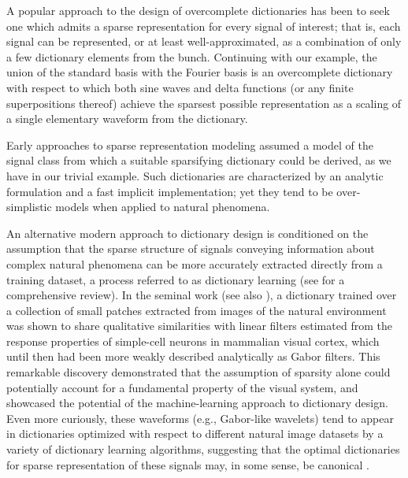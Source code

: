 A popular approach to the design of overcomplete dictionaries has been to seek one which admits a sparse representation for every signal of interest; that is, each signal can be represented, or at least well-approximated, as a combination of only a few dictionary elements from the bunch. Continuing with our example, the union of the standard basis with the Fourier basis is an overcomplete dictionary with respect to which both sine waves and delta functions (or any finite superpositions thereof) achieve the sparsest possible representation as a scaling of a single elementary waveform from the dictionary.

Early approaches to sparse representation modeling assumed a model of the signal class from which a suitable sparsifying dictionary could be derived, as we have in our trivial example. Such dictionaries are characterized by an analytic formulation and a fast implicit implementation; yet they tend to be over-simplistic models when applied to natural phenomena. 

An alternative modern approach to dictionary design is conditioned on the assumption that the sparse structure of signals conveying information about complex natural phenomena can be more accurately extracted directly from a training dataset, a process referred to as dictionary learning  (see \cite{Zhang15} for a comprehensive review). In the seminal work \cite{Olshausen96} (see also \cite{hurri1996image, bell1997independent, van1998independent}), a dictionary trained over a collection of small patches extracted from images of the natural environment was shown to share qualitative similarities with linear filters estimated from the response properties of simple-cell neurons in mammalian visual cortex, which until then had been more weakly described analytically as Gabor filters. This remarkable discovery demonstrated that the assumption of sparsity alone could potentially account for a fundamental property of the visual system, and showcased the potential of the machine-learning approach to dictionary design. Even more curiously, these waveforms (e.g., Gabor-like wavelets) tend to appear in dictionaries optimized with respect to different natural image datasets by a variety of dictionary learning algorithms, suggesting that the optimal dictionaries for sparse representation of these signals may, in some sense, be canonical \cite{donoho2001can}.


